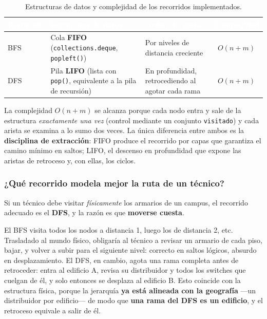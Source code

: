 \documentclass[11pt, a4paper]{article}
\newcommand{\encabezado}[1]{%
    \cellcolor{tabhead}\textcolor{white}{\textbf{#1}}}
\newcommand{\code}[1]{\texttt{\small #1}}
\begin{document}
\begin{table}[htbp]
\centering
\caption{Estructuras de datos y complejidad de los recorridos implementados.}
\label{tab:bfs_dfs}
\small
\begin{tabular}{L{2.2cm} L{4.4cm} L{3.2cm} c}
    \toprule
    \encabezado{Recorrido} & \encabezado{Estructura de datos} &
    \encabezado{Orden de visita} & \encabezado{Complejidad} \\
    \midrule
    BFS & Cola \textbf{FIFO}
          (\code{collections.deque}, \code{popleft()})
        & Por niveles de distancia creciente
        & $O(n+m)$ \\
    DFS & Pila \textbf{LIFO}
          (lista con \code{pop()}, equivalente a la pila de recursión)
        & En profundidad, retrocediendo al agotar cada rama
        & $O(n+m)$ \\
    \bottomrule
\end{tabular}
\end{table}

La complejidad $O(n+m)$ se alcanza porque cada nodo entra y sale de la
estructura \textit{exactamente una vez} (control mediante un conjunto
\code{visitado}) y cada arista se examina a lo sumo dos veces. La única
diferencia entre ambos es la \textbf{disciplina de extracción}: FIFO produce
el recorrido por capas que garantiza el camino mínimo en saltos; LIFO, el
descenso en profundidad que expone las aristas de retroceso y, con ellas,
los ciclos.

\subsubsection*{¿Qué recorrido modela mejor la ruta de un técnico?}

Si un técnico debe visitar \textit{físicamente} los armarios de un campus,
el recorrido adecuado es el \textbf{DFS}, y la razón es que
\textbf{moverse cuesta}.

El BFS visita todos los nodos a distancia 1, luego los de distancia 2, etc.
Trasladado al mundo físico, obligaría al técnico a revisar un armario de
cada piso, bajar, y volver a subir para el siguiente nivel: correcto en
saltos lógicos, absurdo en desplazamiento. El DFS, en cambio, agota una
rama completa antes de retroceder: entra al edificio A, revisa su
distribuidor y todos los switches que cuelgan de él, y solo entonces se
desplaza al edificio B. Esto coincide con la estructura física, porque la
jerarquía \textbf{ya está alineada con la geografía} —un distribuidor por
edificio— de modo que \textbf{una rama del DFS es un edificio}, y el
retroceso equivale a salir de él.
\end{document}
